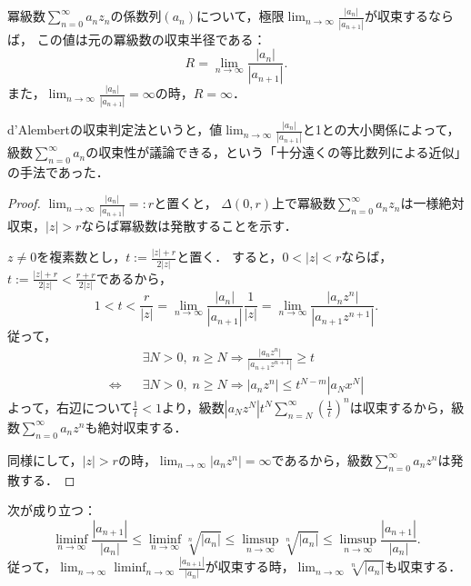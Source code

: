 \documentclass[uplatex, dvipdfmx]{jsreport}
\begin{document}
\begin{proposition}[d'Alembertの公式]\label{prop-d'Alembert's-formula}
    冪級数$\sum^\infty_{n=0}a_nz_n$の係数列$(a_n)$について，極限$\lim_{n\to\infty}\frac{|a_n|}{|a_{n+1}|}$が収束するならば，
    この値は元の冪級数の収束半径である：
    \[ R=\lim_{n\to\infty}\frac{|a_n|}{|a_{n+1}|}. \]
    また，$\lim_{n\to\infty}\frac{|a_n|}{|a_{n+1}|}=\infty$の時，$R=\infty$．
\end{proposition}
\begin{remark}
    d'Alembertの収束判定法というと，値$\lim_{n\to\infty}\frac{|a_n|}{|a_{n+1}|}$と1との大小関係によって，
    級数$\sum^\infty_{n=0}a_n$の収束性が議論できる，という「十分遠くの等比数列による近似」の手法であった．
\end{remark}
\begin{proof}
    $\lim_{n\to\infty}\frac{|a_n|}{|a_{n+1}|}=:r$と置くと，
    $\Delta(0,r)$上で冪級数$\sum^\infty_{n=0}a_nz_n$は一様絶対収束，$|z|>r$ならば冪級数は発散することを示す．

    $z\ne 0$を複素数とし，$t:=\frac{|z|+r}{2|z|}$と置く．
    すると，$0<|z|<r$ならば，$t:=\frac{|z|+r}{2|z|}<\frac{r+r}{2|z|}$であるから，
    \[ 1<t<\frac{r}{|z|}=\lim_{n\to\infty}\frac{|a_n|}{|a_{n+1}|}\frac{1}{|z|}=\lim_{n\to\infty}\frac{|a_nz^n|}{|a_{n+1}z^{n+1}|}. \]
    従って，
    \begin{align*}
        &\exists N>0,\;n\ge N\Rightarrow\frac{|a_nz^n|}{|a_{n+1}z^{n+1}|}\ge t\\
        \Leftrightarrow\;\;\; &\exists N>0,\;n\ge N\Rightarrow|a_nz^n|\le t^{N-m}|a_Nx^N|
    \end{align*}
    よって，右辺について$\frac{1}{t}<1$より，級数$|a_Nz^N|t^N\sum^\infty_{n=N}\left(\frac{1}{t}\right)^n$は収束するから，級数$\sum^\infty_{n=0}a_nz^n$も絶対収束する．

    同様にして，$|z|>r$の時，$\lim_{n\to\infty}|a_nz^n|=\infty$であるから，級数$\sum^\infty_{n=0}a_nz^n$は発散する．
\end{proof}

\begin{lemma}
    次が成り立つ：
    \[ \liminf_{n\to\infty}\frac{|a_{n+1}|}{|a_n|}\le\liminf_{n\to\infty}\sqrt[n]{|a_n|}\le\limsup_{n\to\infty}\sqrt[n]{|a_n|}\le\limsup_{n\to\infty}\frac{|a_{n+1}|}{|a_n|}. \]
    従って，$\lim_{n\to\infty}\liminf_{n\to\infty}\frac{|a_{n+1}|}{|a_n|}$が収束する時，$\lim_{n\to\infty}\sqrt[n]{|a_n|}$も収束する．
\end{lemma}
\end{document}
